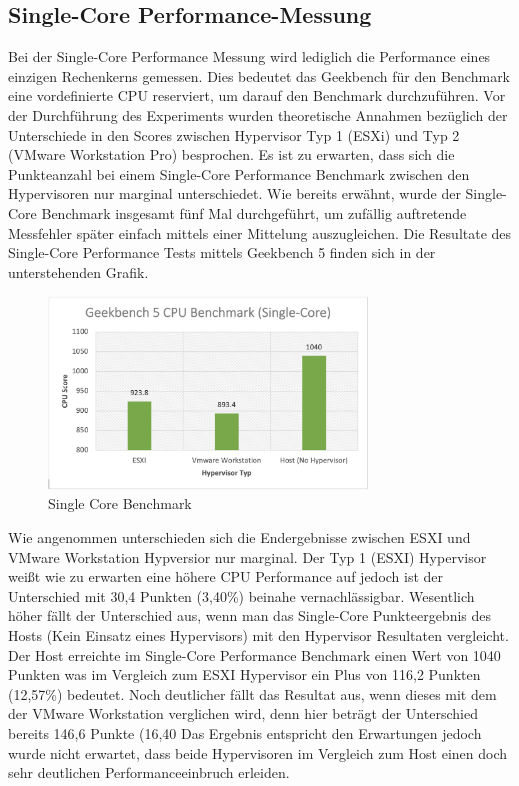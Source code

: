\documentclass[conference]{IEEEtran}
\begin{document}
\subsection{Single-Core Performance-Messung}
Bei der Single-Core Performance Messung wird lediglich die Performance eines einzigen Rechenkerns gemessen. Dies bedeutet das Geekbench für den Benchmark eine vordefinierte CPU reserviert, um darauf den Benchmark durchzuführen. Vor der Durchführung des Experiments wurden theoretische Annahmen bezüglich der Unterschiede in den Scores zwischen Hypervisor Typ 1 (ESXi) und Typ 2 (VMware Workstation Pro) besprochen. Es ist zu erwarten, dass sich die Punkteanzahl bei einem Single-Core Performance Benchmark zwischen den Hypervisoren nur marginal unterschiedet.
Wie bereits erwähnt, wurde der Single-Core Benchmark insgesamt fünf Mal durchgeführt, um zufällig auftretende Messfehler später einfach mittels einer Mittelung auszugleichen. Die Resultate des Single-Core Performance Tests mittels Geekbench 5 finden sich in der unterstehenden Grafik. \newline 

\begin{figure}[!h]
	\centering
	\includegraphics[keepaspectratio,width=8.5cm,height=0.75\textheight]{singlecore.png}
	\caption{Single Core Benchmark}
	\label{singlecore}
\end{figure}

Wie angenommen unterschieden sich die Endergebnisse zwischen ESXI und VMware Workstation Hypversior nur marginal. Der Typ 1 (ESXI) Hypervisor weißt wie zu erwarten eine höhere CPU Performance auf jedoch ist der Unterschied mit 30,4 Punkten (3,40\%) beinahe vernachlässigbar. Wesentlich höher fällt der Unterschied aus, wenn man das Single-Core Punkteergebnis des Hosts (Kein Einsatz eines Hypervisors) mit den Hypervisor Resultaten vergleicht. Der Host erreichte im Single-Core Performance Benchmark einen Wert von 1040 Punkten was im Vergleich zum ESXI Hypervisor ein Plus von 116,2 Punkten (12,57\%) bedeutet. Noch deutlicher fällt das Resultat aus, wenn dieses mit dem der VMware Workstation verglichen wird, denn hier beträgt der Unterschied bereits 146,6 Punkte (16,40%
Das Ergebnis entspricht den Erwartungen jedoch wurde nicht erwartet, dass beide Hypervisoren im Vergleich zum Host einen doch sehr deutlichen Performanceeinbruch erleiden.
\end{document}
